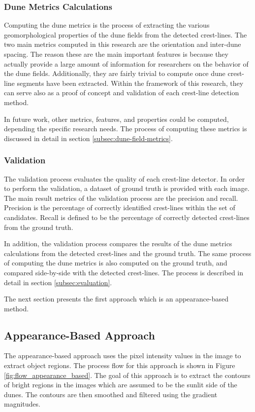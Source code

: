 \subsubsection*{Dune Metrics Calculations}
Computing the dune metrics is the process of extracting the various geomorphological properties of the dune fields from the detected crest-lines. The two main metrics computed in this research are the orientation and inter-dune spacing. The reason these are the main important features is because they actually provide a large amount of information for researchers on the behavior of the dune fields. Additionally, they are fairly trivial to compute once dune crest-line segments have been extracted. Within the framework of this research, they can serve also as a proof of concept and validation of each crest-line detection method. 

In future work, other metrics, features, and properties could be computed, depending the specific research needs. The process of computing these metrics is discussed in detail in section \ref{subsec:dune-field-metrics}.

\subsubsection*{Validation}
The validation process evaluates the quality of each crest-line detector. In order to perform the validation, a dataset of ground truth is provided with each image. The main result metrics of the validation process are the precision and recall. Precision is the percentage of correctly identified crest-lines within the set of candidates. Recall is defined to be the percentage of correctly detected crest-lines from the ground truth. 

In addition, the validation process compares the results of the dune metrics calculations from the detected crest-lines and the ground truth. The same process of computing the dune metrics is also computed on the ground truth, and compared side-by-side with the detected crest-lines. The process is described in detail in section \ref{subsec:evaluation}.

The next section presents the first approach which is an appearance-based method.



\subsection{Appearance-Based Approach} \label{subsection:appearance_based_approach}
The appearance-based approach uses the pixel intensity values in the image to extract object regions. The process flow for this approach is shown in Figure \ref{fig:flow_appearance_based}. The goal of this approach is to extract the contours of bright regions in the images which are assumed to be the sunlit side of the dunes. The contours are then smoothed and filtered using the gradient magnitudes.

